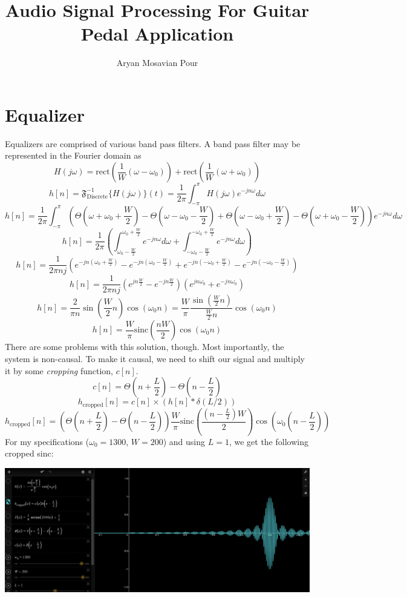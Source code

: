 \documentclass[a4paper]{article}
\title{Audio Signal Processing For Guitar Pedal Application}
\author{Aryan Mosavian Pour}
\begin{document}
\maketitle
\section{Equalizer}
Equalizers are comprised of various band pass filters. A band pass filter may be represented in the Fourier domain as
$$H(j\omega) = \text{rect}(\frac{1}{W}(\omega - \omega_0)) + \text{rect}(\frac{1}{W}(\omega + \omega_0))$$
$$h[n] = \mathfrak{F}^{-1}_\text{Discrete}\{H(j\omega)\}(t) = \frac{1}{2\pi}\int_{-\pi}^\pi H(j\omega) e^{-jn\omega}d\omega$$
$$h[n] = \frac{1}{2\pi}\int_{-\pi}^\pi (\Theta(\omega + \omega_0 + \frac{W}{2})-\Theta(\omega - \omega_0 - \frac{W}{2}) + \Theta(\omega - \omega_0 + \frac{W}{2})-\Theta(\omega + \omega_0 - \frac{W}{2}))e^{-jn\omega}d\omega$$
$$h[n] = \frac{1}{2\pi}(\int_{\omega_0 - \frac{W}{2}}^{\omega_0 + \frac{W}{2}} e^{-jn\omega}d\omega + \int_{-\omega_0 - \frac{W}{2}}^{-\omega_0 + \frac{W}{2}} e^{-jn\omega}d\omega)$$
$$h[n] = \frac{1}{2\pi nj}(e^{-jn(\omega_0 + \frac{W}{2})} - e^{-jn(\omega_0 - \frac{W}{2})} + e^{-jn(-\omega_0 + \frac{W}{2})} - e^{-jn(-\omega_0 - \frac{W}{2})})$$
$$h[n] = \frac{1}{2\pi nj}(e^{jn\frac{W}{2}} - e^{-jn\frac{W}{2}})(e^{jn\omega_0} + e^{-jn\omega_0})$$
$$h[n] = \frac{2}{\pi n}\sin(\frac{W}{2} n)\cos(\omega_0 n) = \frac{W}{\pi} \frac{\sin(\frac{W}{2}n)}{\frac{W}{2}n}\cos(\omega_0 n)$$
$$h[n] = \frac{W}{\pi} \text{sinc}(\frac{nW}{2})\cos(\omega_0 n)$$
There are some problems with this solution, though. Most importantly, the system is non-causal. To make it causal, we need to shift our signal and multiply it by some \textit{cropping} function, $c[n]$. 
$$c[n] = \Theta(n + \frac{L}{2}) - \Theta(n - \frac{L}{2})$$
$$h_\text{cropped}[n] = c[n] \times (h[n] * \delta(L/2))$$
$$h_\text{cropped}[n] = (\Theta(n + \frac{L}{2}) - \Theta(n - \frac{L}{2})) \frac{W}{\pi} \text{sinc}(\frac{(n-\frac{L}{2})W}{2})\cos(\omega_0 (n-\frac{L}{2}))$$
For my specifications ($\omega_0 = 1300$, $W = 200$) and using $L = 1$, we get the following cropped sinc:
\begin{center}
\includegraphics[scale=0.3]{cropped_sinc.png} 
\end{center}
\end{document}
